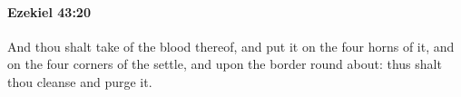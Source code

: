 
		\paragraph{Ezekiel 43:20} %
			\label{EZEKIEL-43-20}

			And thou shalt take of the blood thereof, and put it on the four horns of it, and on the four corners of the settle, and upon the border round about: thus shalt thou cleanse and purge it.


